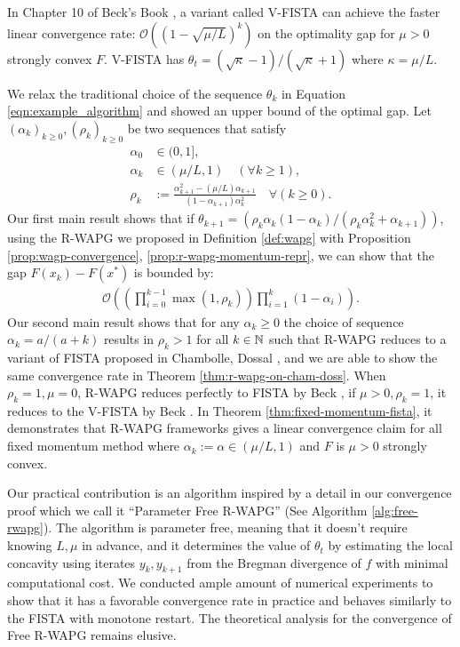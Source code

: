 \documentclass[12pt]{article}
\begin{document}
        In Chapter 10 of Beck's Book \cite{beck_first-order_2017}, a variant called V-FISTA can achieve the faster linear convergence rate: $\mathcal O((1 - \sqrt{\mu/L})^k)$ on the optimality gap for $\mu > 0$ strongly convex $F$. 
        V-FISTA has $\theta_t = (\sqrt{\kappa} - 1)/(\sqrt{\kappa} + 1)$ where $\kappa = \mu/L$. 
        \par
        We relax the traditional choice of the sequence $\theta_k$ in Equation \ref{eqn:example_algorithm} and showed an upper bound of the optimal gap. 
        Let $(\alpha_k)_{k \ge0}, (\rho_k)_{k \ge 0}$ be two sequences that satisfy
        \begin{align*}
            \alpha_0 &\in (0, 1], 
            \\
            \alpha_k &\in (\mu/L, 1) \quad (\forall k \ge 1), 
            \\
            \rho_k &:= \frac{\alpha_{k + 1}^2 - (\mu/L)\alpha_{k + 1}}{(1 - \alpha_{k + 1})\alpha_k^2} \quad \forall (k \ge 0). 
        \end{align*}
        Our first main result shows that if $\theta_{k + 1} = (\rho_k\alpha_k(1 - \alpha_k)/(\rho_k\alpha_k^2 + \alpha_{k + 1}))$, using the R-WAPG we proposed in Definition \ref{def:wapg} with Proposition \ref{prop:wagp-convergence}, \ref{prop:r-wapg-momentum-repr}, we can show that the gap $F(x_k) - F(x^*)$ is bounded by:
        \begin{align*}
            \mathcal O\left(
                \left(
                    \prod_{i = 0}^{k - 1} \max(1, \rho_{k})
                \right)
                \prod_{i = 1}^{k} \left(1  - \alpha_i\right)
            \right). 
        \end{align*}
        Our second main result shows that for any $\alpha_k \ge 0$ the choice of sequence $\alpha_k = a/(a + k)$ results in $\rho_k > 1$ for all $k \in \mathbb N$ such that R-WAPG reduces to a variant of FISTA proposed in Chambolle, Dossal \cite{chambolle_convergence_2015}, and we are able to show the same convergence rate in Theorem \ref{thm:r-wapg-on-cham-doss}. 
        When $\rho_k = 1, \mu = 0$, R-WAPG reduces perfectly to FISTA by Beck \cite{beck_first-order_2017}, if $\mu > 0, \rho_k = 1$, it reduces to the V-FISTA by Beck \cite{beck_first-order_2017}. 
        In Theorem \ref{thm:fixed-momentum-fista}, it demonstrates that R-WAPG frameworks gives a linear convergence claim for all fixed momentum method where $\alpha_k := \alpha \in (\mu/L, 1)$ and  $F$ is $\mu > 0$ strongly convex. 
        \par
        Our practical contribution is an algorithm inspired by a detail in our convergence proof which we call it ``Parameter Free R-WAPG'' (See Algorithm \ref{alg:free-rwapg}). 
        The algorithm is parameter free, meaning that it doesn't require knowing $L, \mu$ in advance, and it determines the value of $\theta_t$ by estimating the local concavity using iterates $y_{k}, y_{k + 1}$ from the Bregman divergence of $f$ with minimal computational cost. 
        We conducted ample amount of numerical experiments to show that it has a favorable convergence rate in practice and behaves similarly to the FISTA with monotone restart. 
        The theoretical analysis for the convergence of Free R-WAPG remains elusive. 
\end{document}

